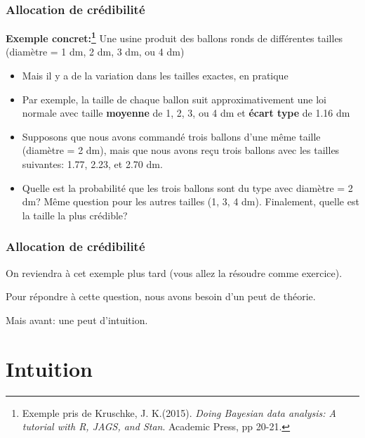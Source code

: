 \documentclass{beamer}
\begin{document}
\begin{frame}
    \frametitle{Allocation de crédibilité}
    \textbf{Exemple concret:\footnote{
      Exemple pris de Kruschke, J. K.(2015). \emph{Doing Bayesian data analysis: A tutorial with R, JAGS, and Stan}.
            Academic Press, pp 20-21.
    }}
    Une usine produit des ballons ronds de différentes tailles (diamètre = 1 dm, 2 dm, 3 dm, ou 4 dm) \pause
    \begin{itemize}
      \item Mais il y a de la variation dans les tailles exactes, en pratique
      \pause
      \item Par exemple, la taille de chaque ballon suit approximativement une loi normale avec
            taille \textbf{moyenne} de 1, 2, 3, ou 4 dm et \textbf{écart type} de 1.16 dm
      \pause
      \item Supposons que nous avons commandé trois ballons d'une même taille (diamètre = 2 dm),
            mais que nous avons reçu trois ballons avec les tailles suivantes: 1.77, 2.23, et 2.70 dm.
      \pause
      \item Quelle est la probabilité que les trois ballons sont du type avec diamètre = 2 dm?
            Même question pour les autres tailles (1, 3, 4 dm). Finalement, quelle est la
            taille la plus crédible?
    \end{itemize}
\end{frame}


\begin{frame}
    \frametitle{Allocation de crédibilité}
    On reviendra à cet exemple plus tard (vous allez la résoudre comme exercice).

    \pause

    \vfill

    Pour répondre à cette question, nous avons besoin d'un peut de théorie.

    \pause

    \vfill

    Mais avant: une peut d'intuition.
\end{frame}



\section{Intuition}
\end{document}
